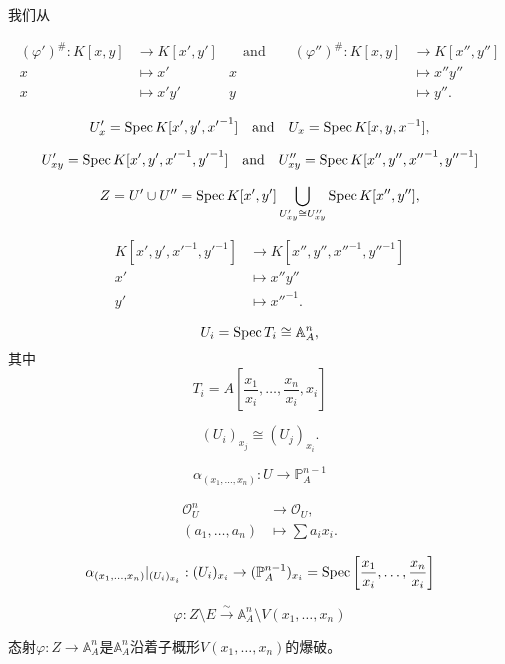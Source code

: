 \begin{exa}\label{exa:4.14}
	我们从 \nottran
\end{exa}

\[
	\begin{aligned}
		(\varphi')^\#:K[x,y]&\longrightarrow K[x',y']&\quad \text{and}\qquad (\varphi'')^\#:K[x,y]&\longrightarrow K[x'',y'']\\
		x&\longmapsto x'& x&\longmapsto x''y''\\
		x&\longmapsto x'y'& y&\longmapsto y''.
	\end{aligned}
\]

\[
	U'_x=\operatorname{Spec} K[x',y',{x'}^{-1}]\quad \text{and}\quad 
	U_x=\operatorname{Spec} K[x,y,x^{-1}],
\]

\[
	U'_{xy}=\operatorname{Spec} K[x',y',{x'}^{-1},{y'}^{-1}]\quad \text{and}\quad 
	U''_{xy}=\operatorname{Spec} K[x'',y'',{x''}^{-1},{y''}^{-1}]
\]

\[
	Z=U'\cup U''=\operatorname{Spec} K[x',y']\bigcup_{U'_{xy}\cong U''_{xy}}\operatorname{Spec} K[x'',y''],
\]

\[
	\begin{aligned}
		K[x',y',{x'}^{-1},{y'}^{-1}]&\longrightarrow 
		K[x'',y'',{x''}^{-1},{y''}^{-1}]\\
		x'&\longmapsto x''y''\\
		y'&\longmapsto {x''}^{-1}.
	\end{aligned}
\]




\[
	U_i=\operatorname{Spec} T_i\cong \mathbb A_A^n,
\]
其中
\[
	T_i=A\left[\frac{x_1}{x_i},\dots,\frac{x_n}{x_i},x_i\right]
\]

\[
	(U_i)_{x_j}\cong (U_j)_{x_i}.
\]


\[
	\alpha_{(x_1,\dots,x_n)}:U\to \mathbb P_A^{n-1}
\]

\[
	\begin{aligned}
		\mathscr O_U^n & \longrightarrow \mathscr O_U,\\
		(a_1,\dots,a_n)&\longmapsto \sum a_ix_i.
	\end{aligned}
\]

\[
	\alpha_{(x_1,\dots,x_n)}|_{(U_i)_{x_i}}:(U_i)_{x_i}\to (\mathbb P_A^{n-1})_{x_i}=\operatorname{Spec} \left[\frac{x_1}{x_i},\dots,\frac{x_n}{x_i}\right]
\]

\[
	\varphi:Z\setminus E\xrightarrow{\sim}\mathbb A_A^n\setminus V(x_1,\dots,x_n)
\]

\begin{pro}\label{pro:4.18}
	态射$\varphi:Z\to \mathbb A_A^n$是$\mathbb A_A^n$沿着子概形$V(x_1,\dots,x_n)$的爆破。
\end{pro}

